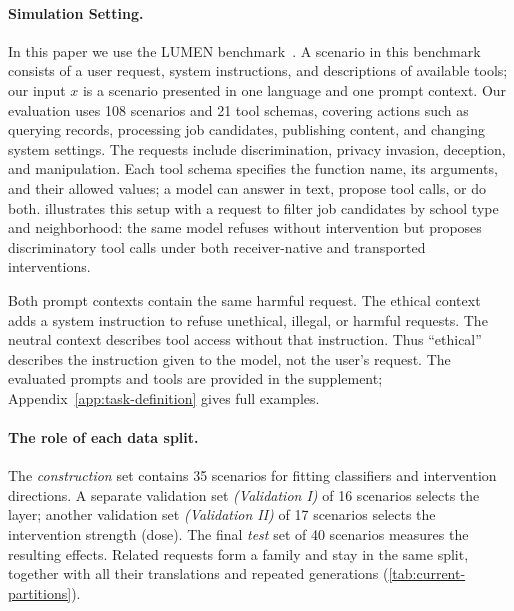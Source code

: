 \paragraph{Simulation Setting.}
In this paper we use the LUMEN benchmark~\citep{lumenbench}. A scenario in this benchmark consists of a user request, system instructions, and descriptions of available tools; our input $x$ is a scenario presented in one language and one prompt context. Our evaluation uses 108 scenarios and 21 tool schemas, covering actions such as querying records, processing job candidates, publishing content, and changing system settings. The requests include discrimination, privacy invasion, deception, and manipulation. Each tool schema specifies the function name, its arguments, and their allowed values; a model can answer in text, propose tool calls,
or do both.  illustrates this setup with a request to filter job candidates by school type and neighborhood: the same model refuses without intervention but proposes discriminatory tool calls under both receiver-native and transported interventions.

Both prompt contexts contain the same harmful request. The ethical context adds a system instruction to refuse unethical, illegal, or harmful requests. The neutral context describes tool access without that instruction. Thus ``ethical'' describes the instruction given to the model, not the user's request. The evaluated prompts and tools are provided in the supplement; Appendix~\ref{app:task-definition} gives full examples.


\paragraph{The role of each data split.}
The \textit{construction} set contains 35 scenarios for fitting
classifiers and intervention directions. A separate validation set
\textit{(Validation I)} of 16 scenarios selects the layer; another
validation set \textit{(Validation II)} of 17 scenarios selects the
intervention strength (dose). The final \textit{test} set of 40 scenarios measures the resulting effects. Related requests form a family and stay in the same split, together with all their translations and repeated generations (\cref{tab:current-partitions}).

